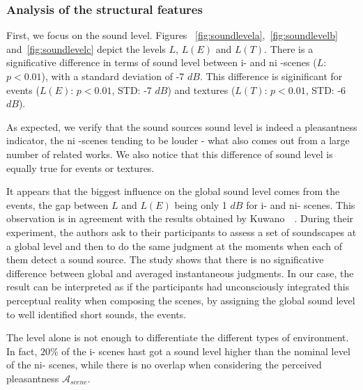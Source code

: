 \documentclass[twoside,twocolumn]{article}
\begin{document}
\subsubsection*{Analysis of the structural features}

First, we focus on the sound level. Figures ~\ref{fig:soundlevela},~\ref{fig:soundlevelb} and~\ref{fig:soundlevelc} depict the levels $L$, $L(E)$ and $L(T)$. There is a significative difference in terms of sound level between i- and ni -scenes ($L$: $p<0.01$), with a standard deviation of -7 $dB$. This difference is siginificant for events ($L(E)$: $p<0.01$, STD: -7 $dB$) and textures ($L(T)$: $p<0.01$, STD: -6 $dB$).

As expected, we verify that the sound sources sound level is indeed a pleasantness indicator, the ni -scenes tending to be louder - what also comes out from a large number of related works. We also notice that this difference of sound level is equally true for events or textures.

It appears that the biggest influence on the global sound level comes from the events, the gap between $L$ and $L(E)$ being only 1 $dB$ for i- and ni- scenes. This observation is in agreement with the results obtained by Kuwano~\al~\cite{kuwano_memory_2003}. During their experiment, the authors ask to their participants to assess a set of soundscapes at a global level and then to do the same judgment at the moments when each of them detect a sound source. The study shows that there is no significative difference between global and averaged instantaneous judgments. In our case, the result can be interpreted as if the participants had unconsciously integrated this perceptual reality when composing the scenes, by assigning the global sound level to well identified short sounds, \ie the events.

The level alone is not enough to differentiate the different types of environment. In fact, $20\%$ of the i- scenes hast got a sound level higher than the nominal level of the ni- scenes, while there is no overlap when considering the perceived pleasantness $\mathcal{A}_{scene}$.
\end{document}
